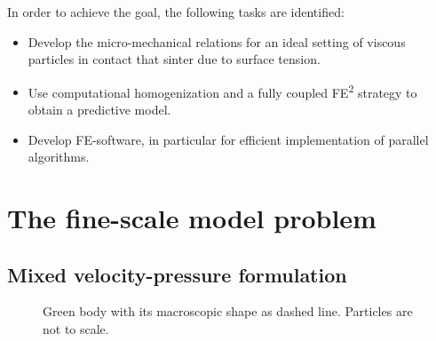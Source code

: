 \documentclass[MikaelDissertation.tex]{subfiles}
\begin{document}
In order to achieve the goal, the following tasks are identified:
\begin{itemize}
 \item Develop the micro-mechanical relations for an ideal setting of viscous particles in contact that sinter due to surface tension.
 \item Use computational homogenization and a fully coupled FE\textsuperscript{2} strategy to obtain a predictive model.
 \item Develop FE-software, in particular for efficient implementation of parallel algorithms.
\end{itemize}

\chapter{The fine-scale model problem}

\section{Mixed velocity-pressure formulation}

\begin{figure}[htpb!]
\centering
{}
\caption{Green body with its macroscopic shape as dashed line. Particles are not to scale.}
\label{fig:greenbody}
\end{figure}
\end{document}
